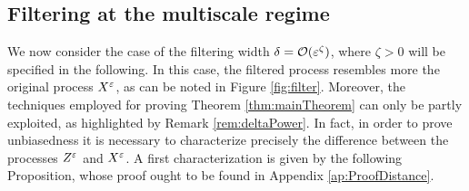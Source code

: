 \documentclass[10pt]{article}
\begin{document}

\subsection{Filtering at the multiscale regime}\label{sec:Fast}


We now consider the case of the filtering width $\delta = \mathcal O(\varepsilon^\zeta)$, where $\zeta > 0$ will be specified in the following. In this case, the filtered process resembles more the original process $X^\varepsilon$, as can be noted in Figure \ref{fig:filter}. Moreover, the techniques employed for proving Theorem \ref{thm:mainTheorem} can only be partly exploited, as highlighted by Remark \ref{rem:deltaPower}. In fact, in order to prove unbiasedness it is necessary to characterize precisely the difference between the processes $Z^\varepsilon$ and $X^\varepsilon$. A first characterization is given by the following Proposition, whose proof ought to be found in Appendix \ref{ap:ProofDistance}.
\end{document}
